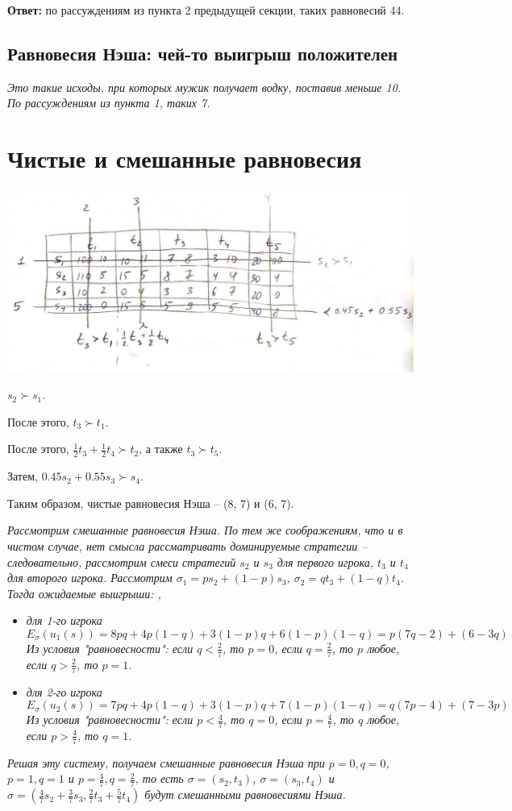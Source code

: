 \documentclass[a4paper,11pt,notitlepage]{article}
\newcommand{\ans}{\textbf{Ответ: }}
\begin{document}
\ans по рассуждениям из пункта 2 предыдущей секции, таких равновесий 44.

\subsection{Равновесия Нэша: чей-то выигрыш положителен}

\textit{Это такие исходы, при которых мужик получает водку, поставив меньше 10. По рассуждениям из пункта 1, таких 7.}

\section{Чистые и смешанные равновесия}

\includegraphics[scale=0.5]{photo-1}

$s_2 \succ s_1$.

После этого, $t_3 \succ t_1$.

После этого, $\frac{1}{2}t_3 + \frac{1}{2}t_4 \succ t_2$, а также $t_3 \succ t_5$.

Затем, $0.45 s_2 + 0.55 s_3 \succ s_4$.

Таким образом, чистые равновесия Нэша -- (8, 7) и (6, 7).

\textit{Рассмотрим смешанные равновесия Нэша. По тем же соображениям, что и в чистом случае, нет смысла рассматривать доминируемые стратегии -- следовательно, рассмотрим смеси стратегий $s_2$ и $s_3$ для первого игрока, $t_3$ и $t_4$ для второго игрока. Рассмотрим $\sigma_1 = p s_2 + (1-p) s_3$, $\sigma_2 = q t_3 + (1-q) t_4$. Тогда ожидаемые выигрыши: , }

\begin{itemize}
\item \textit{для 1-го игрока 
$$E_\sigma (u_1(s)) = 8pq + 4p(1-q) + 3(1-p)q + 6(1-p)(1-q) = p(7q - 2) + (6-3q)$$
Из условия "равновесности": если $q < \frac{2}{7}$, то $p = 0$, если $q = \frac{2}{7}$, то $p$ любое, если $q > \frac{2}{7}$, то $p = 1$.}
\item \textit{для 2-го игрока 
$$E_\sigma (u_2(s)) = 7pq + 4p(1-q) + 3(1-p)q + 7(1-p)(1-q) = q(7p - 4) + (7-3p)$$ 
Из условия "равновесности": если $p < \frac{4}{7}$, то $q = 0$, если $p = \frac{4}{7}$, то $q$ любое, если $p > \frac{4}{7}$, то $q = 1$.}
\end{itemize}

\textit{Решая эту систему, получаем смешанные равновесия Нэша при $p = 0, q = 0$, $p = 1, q = 1$ и $p = \frac{4}{7}, q = \frac{2}{7}$, то есть $\sigma = (s_2, t_3)$, $\sigma = (s_3, t_4)$ и $\sigma = (\frac{4}{7} s_2 + \frac{3}{7} s_3, \frac{2}{7} t_3 + \frac{5}{7} t_4)$ будут смешанными равновесиями Нэша.}
\end{document}
